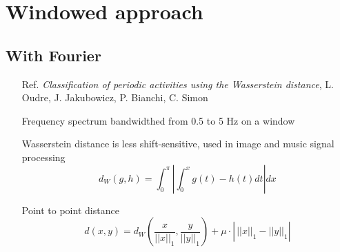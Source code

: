 \documentclass{beamer}
\begin{document}
\section{Windowed approach}
\subsection{With Fourier}

\begin{frame}
\begin{itemize}
\item[Ref.] \emph{Classification of periodic activities using the Wasserstein distance}, L. Oudre, J. Jakubowicz, P. Bianchi, C. Simon

\item[Frequency] spectrum bandwidthed from 0.5 to 5 Hz on a window

\item[Wasserstein] distance is less shift-sensitive, used in image and music signal processing
\[d_W(g,h)=\int_0^\pi\left|\int_0^xg(t)-h(t)dt\right|dx\]

\item[Point]to point distance
\[d(x,y)=d_W(\frac x{||x||_1},\frac y{||y||_1})+\mu\cdot\left|\phantom{\frac{}{}}||x||_1-||y||_1\right|\]
\end{itemize}
\end{frame}
\end{document}
